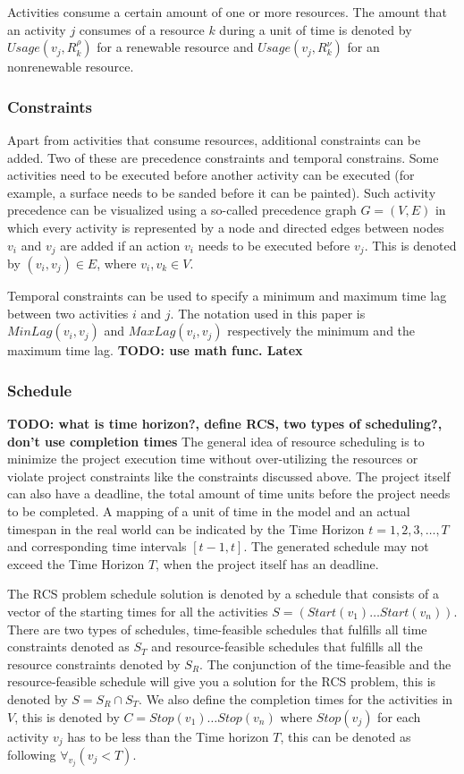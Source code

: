 \documentclass{article}
\newcommand{\TODO}[1]{{\color{red}\textbf{TODO: #1}}}
\newcommand{\renres}[0]{R^\rho} %
\newcommand{\conres}[0]{R^\nu} %
\newcommand{\usage}[1]{\textit{Usage}(#1)} %
\newcommand{\start}[1]{\textit{Start}(#1)} %
\begin{document}
Activities consume a certain amount of one or more resources.
The amount that an activity $j$ consumes of a resource $k$ during a unit of time is denoted by $\usage{v_j, \renres_k}$ for a renewable resource and   $\usage{v_j, \conres_k}$ for an nonrenewable resource.

\subsubsection{Constraints}
Apart from activities that consume resources, additional constraints can be added.
Two of these are precedence constraints and temporal constrains.
Some activities need to be executed before another activity can be executed (for example, a surface needs to be sanded before it can be painted).
Such activity precedence can be visualized using a so-called precedence graph $G = (V, E)$ in which every activity is represented by a node and directed edges between nodes $v_i$ and $v_j$ are added if an action $v_i$ needs to be executed before $v_j$.
This is denoted by $(v_i,v_j) \in E$, where $v_i, v_k \in V$.

Temporal constraints can be used to specify a minimum and maximum time lag between two activities $i$ and $j$.
The notation used in this paper is $MinLag(v_i, v_j)$ and $MaxLag(v_i, v_j)$ respectively the minimum and the maximum time lag.
\TODO{use math func. Latex}

\subsubsection{Schedule}
\TODO{what is time horizon?, define RCS, two types of scheduling?, don't use completion times}
The general idea of resource scheduling is to minimize the project execution time without over-utilizing the resources or violate project constraints like the constraints discussed above.
The project itself can also have a deadline, the total amount of time units before the project needs to be completed.
A mapping of a unit of time in the model and an actual timespan in the real world can be indicated by the Time Horizon $t=1,2,3,\ldots,T$ and corresponding time intervals $[t-1,t]$.
The generated schedule may not exceed the Time Horizon $T$, when the project itself has an deadline.

The RCS problem schedule solution is denoted by a schedule that consists of a vector of the starting times for all the activities $S =  (\start{v_1} \ldots \start{v_n})$.
There are two types of schedules, time-feasible schedules that fulfills all time constraints denoted as $S_T$ and resource-feasible schedules that fulfills all the resource constraints denoted by $S_R$.
The conjunction of the time-feasible and the resource-feasible schedule will give you a solution for the RCS problem, this is denoted by $S = S_R \cap S_T$.
We also define the completion times for the activities in $V$, this is denoted by $C = Stop(v_1) \ldots Stop(v_n)$ where $Stop(v_j)$ for each activity $v_j$ has to be less than the Time horizon $T$, this can be denoted as following $\forall_{v_j}(v_j < T)$.
\end{document}
